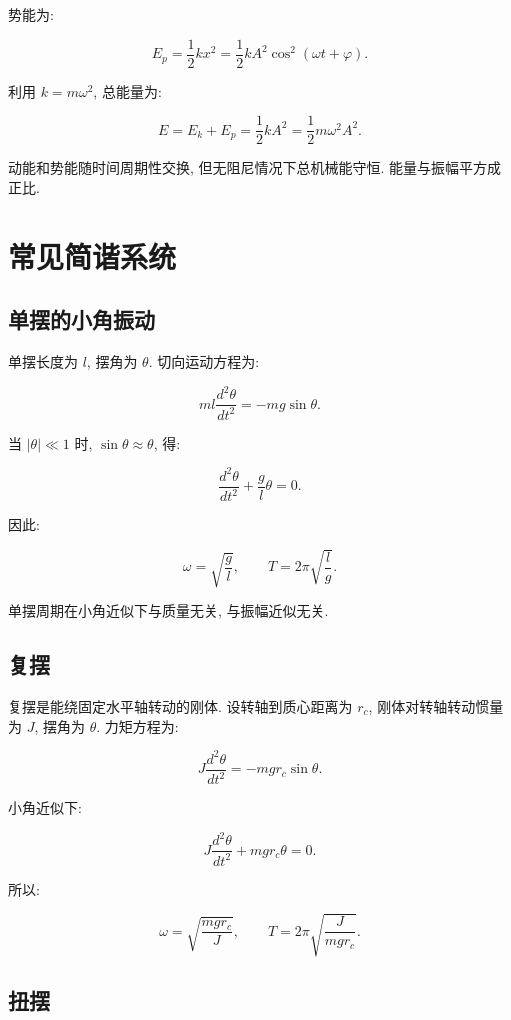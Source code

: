 \documentclass[
  a4paper,
]{ctexrep}
\begin{document}
势能为:

\[
E_p=\frac{1}{2}kx^2=\frac{1}{2}kA^2\cos^2(\omega t+\varphi).
\]

利用 \(k=m\omega^2\), 总能量为:

\[
E=E_k+E_p=\frac{1}{2}kA^2=\frac{1}{2}m\omega^2A^2.
\]

动能和势能随时间周期性交换, 但无阻尼情况下总机械能守恒.
能量与振幅平方成正比.

\section{常见简谐系统}\label{ux5e38ux89c1ux7b80ux8c10ux7cfbux7edf}

\subsection{单摆的小角振动}\label{ux5355ux6446ux7684ux5c0fux89d2ux632fux52a8}

单摆长度为 \(l\), 摆角为 \(\theta\). 切向运动方程为:

\[
ml\frac{d^2\theta}{dt^2}=-mg\sin\theta.
\]

当 \(|\theta|\ll 1\) 时, \(\sin\theta\approx\theta\), 得:

\[
\frac{d^2\theta}{dt^2}+\frac{g}{l}\theta=0.
\]

因此:

\[
\omega=\sqrt{\frac{g}{l}},\qquad T=2\pi\sqrt{\frac{l}{g}}.
\]

单摆周期在小角近似下与质量无关, 与振幅近似无关.

\subsection{复摆}\label{ux590dux6446}

复摆是能绕固定水平轴转动的刚体. 设转轴到质心距离为 \(r_c\),
刚体对转轴转动惯量为 \(J\), 摆角为 \(\theta\). 力矩方程为:

\[
J\frac{d^2\theta}{dt^2}=-mgr_c\sin\theta.
\]

小角近似下:

\[
J\frac{d^2\theta}{dt^2}+mgr_c\theta=0.
\]

所以:

\[
\omega=\sqrt{\frac{mgr_c}{J}},\qquad
T=2\pi\sqrt{\frac{J}{mgr_c}}.
\]

\subsection{扭摆}\label{ux626dux6446}
\end{document}
